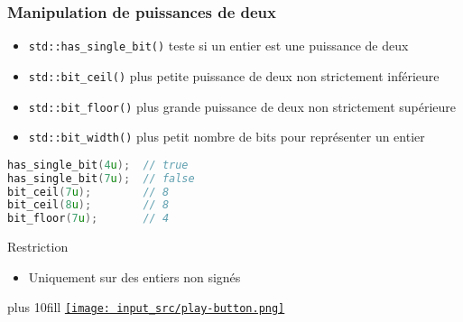 \documentclass[C++.tex]{subfiles}
\begin{document}
\begin{frame}[fragile]
	\frametitle{Manipulation de puissances de deux}
	\begin{itemize}
		\item \lstinline|std::has_single_bit()| teste si un entier est une puissance de deux
		\item \lstinline|std::bit_ceil()| plus petite puissance de deux non strictement inférieure
		\item \lstinline|std::bit_floor()| plus grande puissance de deux non strictement supérieure
		\item \lstinline|std::bit_width()| plus petit nombre de bits pour représenter un entier
	\end{itemize}

	\begin{lstlisting}[language=C++]
has_single_bit(4u);  // true
has_single_bit(7u);  // false
bit_ceil(7u);        // 8
bit_ceil(8u);        // 8
bit_floor(7u);       // 4\end{lstlisting}

	\begin{alertblock}{Restriction}
		\begin{itemize}
			\item Uniquement sur des entiers non signés
		\end{itemize}
	\end{alertblock}

	\vskip 10mm plus 10fill
	\hfill
	\href{https://godbolt.org/#g:!((g:!((g:!((h:codeEditor,i:(filename:'1',fontScale:14,fontUsePx:'0',j:1,lang:c%2B%2B,selection:(endColumn:1,endLineNumber:11,positionColumn:1,positionLineNumber:11,selectionStartColumn:1,selectionStartLineNumber:11,startColumn:1,startLineNumber:11),source:'%23include+%3Ciostream%3E%0A%23include+%3Cbit%3E%0A%0Aint+main()%0A%7B%0A++std::cout+%3C%3C+std::has_single_bit(4u)+%3C%3C+%22%5Cn%22%3B%0A++std::cout+%3C%3C+std::has_single_bit(7u)+%3C%3C+%22%5Cn%22%3B%0A++std::cout+%3C%3C+std::bit_ceil(7u)++%3C%3C+%22%5Cn%22%3B%0A++std::cout+%3C%3C+std::bit_ceil(8u)++%3C%3C+%22%5Cn%22%3B%0A++std::cout+%3C%3C+std::bit_floor(7u)+%3C%3C+%22%5Cn%22%3B%0A%7D%0A'),l:'5',n:'0',o:'C%2B%2B+source+%231',t:'0')),k:50,l:'4',n:'0',o:'',s:0,t:'0'),(g:!((h:executor,i:(argsPanelShown:'1',compilationPanelShown:'0',compiler:g112,compilerOutShown:'0',execArgs:'',execStdin:'',fontScale:14,fontUsePx:'0',j:1,lang:c%2B%2B,libs:!((name:boost,ver:'175')),options:'-std%3Dc%2B%2B20',source:1,stdinPanelShown:'1',tree:'1',wrap:'0'),l:'5',n:'0',o:'Executor+x86-64+gcc+11.2+(C%2B%2B,+Editor+%231)',t:'0')),header:(),k:50,l:'4',n:'0',o:'',s:0,t:'0')),l:'2',n:'0',o:'',t:'0')),version:4}{\texttt{[image: input\_src/play-button.png]}}
\end{frame}
\end{document}
